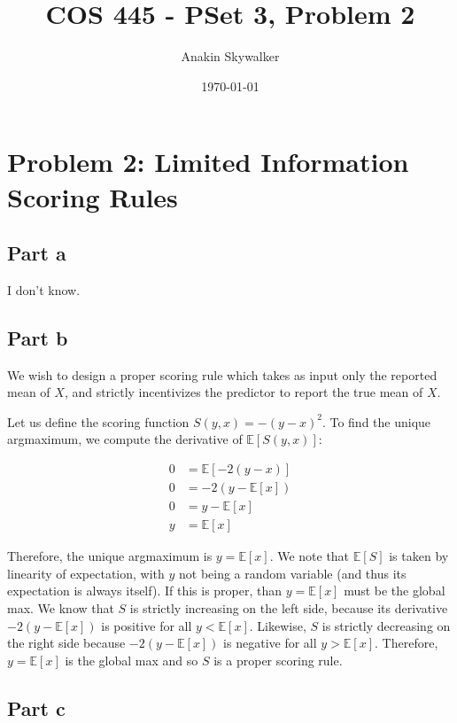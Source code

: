 \documentclass[12pt]{article}%
\begin{document}
\title{COS 445 - PSet 3, Problem 2} %
\author{Anakin Skywalker} %
\date{\today}
\maketitle
\section*{Problem 2: Limited Information Scoring Rules}
\subsection*{Part a}

I don't know.

\subsection*{Part b}

We wish to design a proper scoring rule which takes as input only the reported mean of $X$, and strictly incentivizes the predictor to report the true mean of $X$.

Let us define the scoring function $S(y, x) = -(y - x)^2$. To find the unique argmaximum, we compute the derivative of $\mathbb{E}[S(y, x)]$:

\begin{equation}
\begin{split}
0 &= \mathbb{E}[-2(y - x)]\\
0 &= -2(y - \mathbb{E}[x])\\
0 &= y - \mathbb{E}[x]\\
y &= \mathbb{E}[x]
\end{split}
\end{equation}

Therefore, the unique argmaximum is $y = \mathbb{E}[x]$. We note that $\mathbb{E}[S]$ is taken by linearity of expectation, with $y$ not being a random variable (and thus its expectation is always itself). If this is proper, than $y = \mathbb{E}[x]$ must be the global max. We know that $S$ is strictly increasing on the left side, because its derivative $-2(y - \mathbb{E}[x])$ is positive for all $y < \mathbb{E}[x]$. Likewise, $S$ is strictly decreasing on the right side because $-2(y - \mathbb{E}[x])$ is negative for all $y > \mathbb{E}[x]$. Therefore, $y = \mathbb{E}[x]$ is the global max and so $S$ is a proper scoring rule.

\subsection*{Part c}
\end{document}
